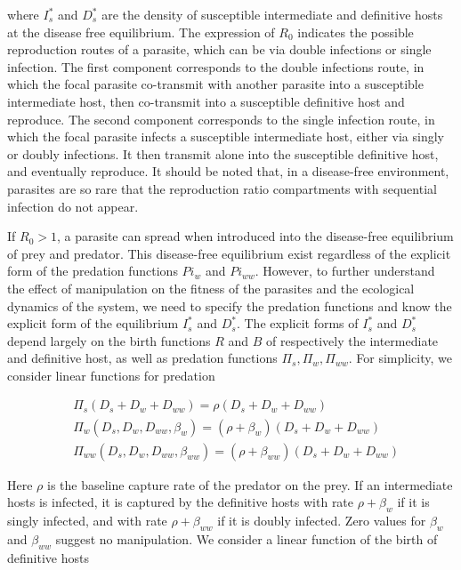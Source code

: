 \documentclass[11pt]{article}
\begin{document}
where $I_s^*$ and $D_s^*$ are the density of susceptible intermediate and definitive hosts at the disease free equilibrium. The expression of $R_0$ indicates the possible reproduction routes of a parasite, which can be via double infections or single infection. The first component corresponds to the double infections route, in which the focal parasite co-transmit with another parasite into a susceptible intermediate host, then co-transmit into a susceptible definitive host and reproduce. The second component corresponds to the single infection route, in which the focal parasite infects a susceptible intermediate host, either via singly or doubly infections. It then transmit alone into the susceptible definitive host, and eventually reproduce. It should be noted that, in a disease-free environment, parasites are so rare that the reproduction ratio compartments with sequential infection do not appear. 


If $R_0 > 1$, a parasite can spread when introduced into the disease-free equilibrium of prey and predator. This disease-free equilibrium exist regardless of the explicit form of the predation functions $Pi_w$ and $Pi_{ww}$. However, to further understand the effect of manipulation on the fitness of the parasites and the ecological dynamics of the system, we need to specify the predation functions and know the explicit form of the equilibrium $I_s^*$ and $D_s^*$. The explicit forms of $I_s^*$ and $D_s^*$ depend largely on the birth functions $R$ and $B$ of respectively the intermediate and definitive host, as well as predation functions $\Pi_s, \Pi_w, \Pi_{ww}$. For simplicity, we consider linear functions for predation 

\begin{align*}
& \Pi_s(D_s + D_w + D_{ww}) = \rho (D_s + D_w + D_{ww}) \\
& \Pi_w(D_s, D_w, D_{ww}, \beta_w) = (\rho + \beta_w) (D_s + D_w + D_{ww}) \\
& \Pi_{ww}(D_s, D_w, D_{ww}, \beta_{ww}) =  (\rho + \beta_{ww}) (D_s + D_w + D_{ww})
\end{align*}

Here $\rho$ is the baseline capture rate of the predator on the prey. If an intermediate hosts is infected, it is captured by the definitive hosts with rate $\rho + \beta_w$ if it is singly infected, and with rate $\rho + \beta_{ww}$ if it is doubly infected. Zero values for $\beta_w$ and $\beta_{ww}$ suggest no manipulation. We consider a linear function of the birth of definitive hosts
\end{document}
